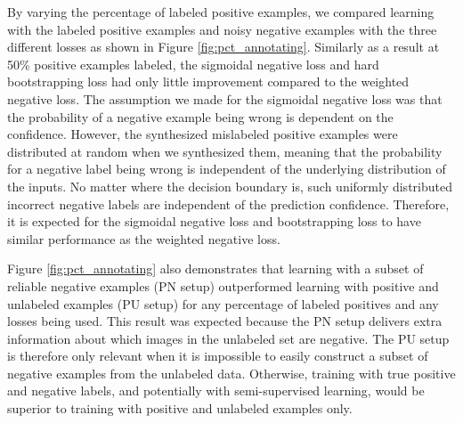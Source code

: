 By varying the percentage of labeled positive examples, we compared learning with the labeled positive examples and noisy negative examples with the three different losses as shown in Figure \ref{fig:pct_annotating}.
Similarly as a result at 50\% positive examples labeled, the sigmoidal negative loss and hard bootstrapping loss had only little improvement compared to the weighted negative loss.
The assumption we made for the sigmoidal negative loss was that the probability of a negative example being wrong is dependent on the confidence.
However, the synthesized mislabeled positive examples were distributed at random when we synthesized them, meaning that the probability for a negative label being wrong is independent of the underlying distribution of the inputs.
No matter where the decision boundary is, such uniformly distributed incorrect negative labels are independent of the prediction confidence.
Therefore, it is expected for the sigmoidal negative loss and bootstrapping loss to have similar performance as the weighted negative loss.

Figure \ref{fig:pct_annotating} also demonstrates that learning with a subset of reliable negative examples (PN setup) outperformed learning with positive and unlabeled examples (PU setup) for any percentage of labeled positives and any losses being used.
This result was expected because the PN setup delivers extra information about which images in the unlabeled set are negative.
The PU setup is therefore only relevant when it is impossible to easily construct a subset of negative examples from the unlabeled data.
Otherwise, training with true positive and negative labels, and potentially with semi-supervised learning, would be superior to training with positive and unlabeled examples only.

